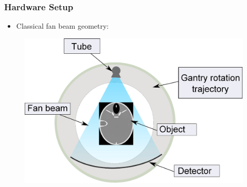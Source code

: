 \begin{frame}
    \frametitle{Hardware Setup}
    \begin{itemize}
        \item Classical fan beam geometry:
    \end{itemize}
    \begin{figure}
        \centering{}
        \includegraphics[scale=0.35]{images/multict.eps}
    \end{figure}
\end{frame}

